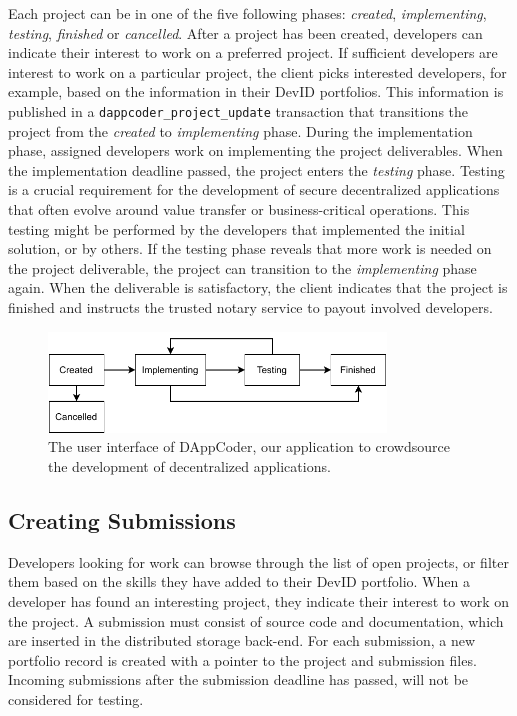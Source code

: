 Each project can be in one of the five following phases: \emph{created}, \emph{implementing}, \emph{testing}, \emph{finished} or \emph{cancelled}.
After a project has been created, developers can indicate their interest to work on a preferred project. 
If sufficient developers are interest to work on a particular project, the client picks interested developers, for example, based on the information in their DevID portfolios.
This information is published in a \texttt{dappcoder\_project\_update} transaction that transitions the project from the \emph{created} to \emph{implementing} phase.
During the implementation phase, assigned developers work on implementing the project deliverables.
When the implementation deadline passed, the project enters the \emph{testing} phase.
Testing is a crucial requirement for the development of secure decentralized applications that often evolve around value transfer or business-critical operations.
This testing might be performed by the developers that implemented the initial solution, or by others.
If the testing phase reveals that more work is needed on the project deliverable, the project can transition to the \emph{implementing} phase again.
When the deliverable is satisfactory, the client indicates that the project is finished and instructs the trusted notary service to payout involved developers.




\begin{figure}[t!]
	\centering
	\includegraphics[width=0.8\textwidth]{devid/resources/devid_project.pdf}
	\caption{The user interface of DAppCoder, our application to crowdsource the development of decentralized applications.}
	\label{fig:devid_project}
\end{figure}

\subsection{Creating Submissions}
\label{subsec:create_submissions}
Developers looking for work can browse through the list of open projects, or filter them based on the skills they have added to their DevID portfolio.
When a developer has found an interesting project, they indicate their interest to work on the project.
A submission must consist of source code and documentation, which are inserted in the distributed storage back-end.
For each submission, a new portfolio record is created with a pointer to the project and submission files.
Incoming submissions after the submission deadline has passed, will not be considered for testing.

